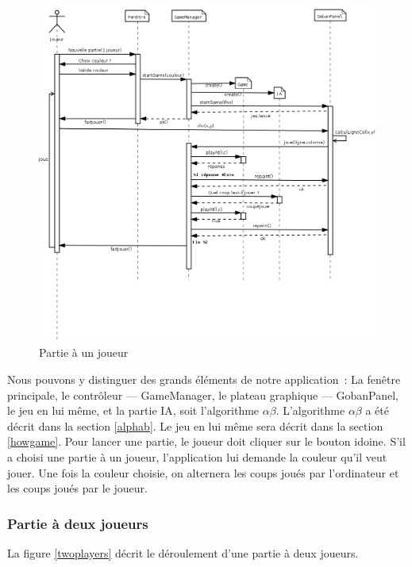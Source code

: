 \documentclass[11pt,a4paper,titlepage,french]{article}
\begin{document}
				\begin{figure}[hbt]
					\begin{center}
						\includegraphics[width=1.1\textwidth]{./IA_1J.png}
					\end{center}
					\caption{Partie à un joueur}
					\label{oneplayer}
				\end{figure}


				Nous pouvons y distinguer des grands éléments de notre application~: La fenêtre principale, le contrôleur --- GameManager, le plateau graphique --- GobanPanel, le jeu en lui même, et la partie IA, soit l'algorithme $\alpha\beta$. L'algorithme $\alpha\beta$ a été décrit dans la section \ref{alphab}. Le jeu en lui même sera décrit dans la section \ref{howgame}. Pour lancer une partie, le joueur doit cliquer sur le bouton idoine. S'il a choisi une partie à un joueur, l'application lui demande la couleur qu'il veut jouer. Une fois la couleur choisie, on alternera les coups joués par l'ordinateur et les coups joués par le joueur.

			\subsubsection{Partie à deux joueurs}

				La figure \ref{twoplayers} décrit le déroulement d'une partie à deux joueurs.
\end{document}
